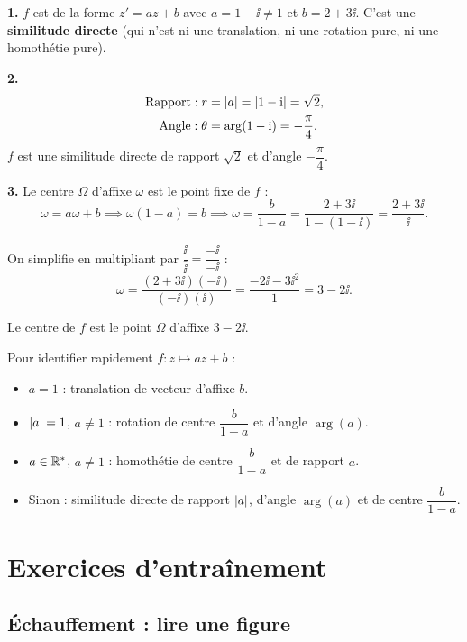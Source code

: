 \textbf{1.} $f$ est de la forme $z' = az + b$ avec $a = 1 - \ii \neq 1$ et $b = 2 + 3\ii$.
C'est une \textbf{similitude directe} (qui n'est ni une translation, ni une rotation pure,
ni une homothétie pure).

\textbf{2.}
$$
\begin{aligned}
	\text{Rapport} : r      &= \left|a\right| = \left|1-\mathrm{i}\right| = \sqrt{2},\\
	\text{Angle} : \theta   &= \arg(1-\mathrm{i}) = -\frac{\pi}{4}.
\end{aligned}
$$
$f$ est une similitude directe de rapport $\sqrt{2}$ et d'angle $-\dfrac{\pi}{4}$.

\textbf{3.} Le centre $\Omega$ d'affixe $\omega$ est le point fixe de $f$ :
$$
\omega = a\omega + b \implies \omega(1-a) = b
\implies \omega = \frac{b}{1-a} = \frac{2+3\ii}{1-(1-\ii)} = \frac{2+3\ii}{\ii}.
$$

On simplifie en multipliant par $\dfrac{\bar{\ii}}{\bar{\ii}} = \dfrac{-\ii}{-\ii}$ :
$$
\omega = \frac{(2+3\ii)(-\ii)}{(-\ii)(\ii)} = \frac{-2\ii - 3\ii^2}{1} = 3 - 2\ii.
$$

Le centre de $f$ est le point $\Omega$ d'affixe $3 - 2\ii$.

\begin{astucebac}
	Pour identifier rapidement $f : z \mapsto az + b$ :
	\begin{itemize}[label=\textbullet]
		\item $a = 1$ : translation de vecteur d'affixe $b$.
		\item $\left|a\right| = 1$, $a \neq 1$ : rotation de centre $\dfrac{b}{1-a}$ et d'angle $\arg(a)$.
		\item $a \in \mathbb{R}^*$, $a \neq 1$ : homothétie de centre $\dfrac{b}{1-a}$ et de rapport $a$.
		\item Sinon : similitude directe de rapport $\left|a\right|$, d'angle $\arg(a)$
		et de centre $\dfrac{b}{1-a}$.
	\end{itemize}
\end{astucebac}



\section{Exercices d'entraînement}

\subsection{Échauffement : lire une figure}

